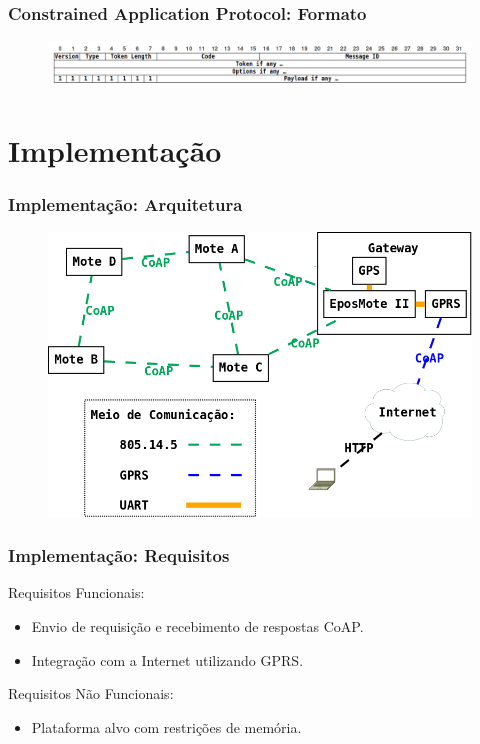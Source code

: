 \documentclass{beamer}
\begin{document}
\begin{frame}
\frametitle{Constrained Application Protocol: Formato}
\begin{figure}
\includegraphics[width=0.9\linewidth]{../figuras/formato}
\end{figure}
\end{frame}

\section{Implementação}

\begin{frame}
\frametitle{Implementação: Arquitetura}
\begin{figure}
\includegraphics[width=0.9\linewidth]{../figuras/arquiteturaSlide}
\end{figure}
\end{frame}

\begin{frame}
\frametitle{Implementação: Requisitos}
Requisitos Funcionais:
\begin{itemize}
    \item Envio de requisição e recebimento de respostas CoAP.
    \item Integração com a Internet utilizando GPRS. 
\end{itemize}
Requisitos Não Funcionais:
\begin{itemize}
    \item Plataforma alvo com restrições de memória.
\end{itemize}
\end{frame}
\end{document}
